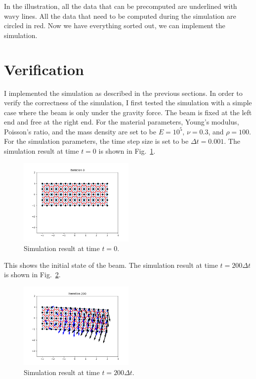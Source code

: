 \documentclass[acmtog]{acmart}
\begin{document}
In the illustration, all the data that can be precomputed are underlined with wavy lines. All the data that need to be computed during the simulation are circled in red. Now we have everything sorted out, we can implement the simulation.

\section{Verification}
I implemented the simulation as described in the previous sections. In order to verify the correctness of the simulation, I first tested the simulation with a simple case where the beam is only under the gravity force. The beam is fixed at the left end and free at the right end. For the material parameters, Young's modulus, Poisson's ratio, and the mass density are set to be $E = 10^5$, $\nu = 0.3$, and $\rho = 100$. For the simulation parameters, the time step size is set to be $\Delta t = 0.001$. The simulation result at time $t=0$ is shown in Fig.~\ref{fig:gravity1}. 

\begin{figure}[H]
  \centering
  \includegraphics[width=0.5\textwidth]{images/gravity1.png}
  \caption{Simulation result at time $t=0$.}
  \label{fig:gravity1}
\end{figure}

This shows the initial state of the beam. The simulation result at time $t=200\Delta t$ is shown in Fig.~\ref{fig:gravity2}.

\begin{figure}[H]
  \centering
  \includegraphics[width=0.5\textwidth]{images/gravity2.png}
  \caption{Simulation result at time $t=200\Delta t$.}
  \label{fig:gravity2}
\end{figure}
\end{document}
